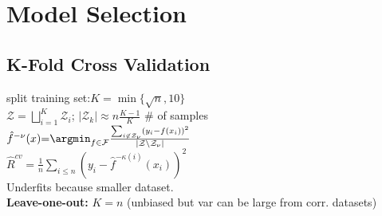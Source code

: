 \section*{Model Selection}
\subsection*{K-Fold Cross Validation}
split training set:$K=\min\{\sqrt{n},10\}$\\
$\mathcal{Z}=\bigsqcup^{K}_{i=1}\mathcal{Z}_i $;
$|\mathcal{Z}_k|\approx n\frac{K-1}{K}$ \# of samples\\
$\hat{f}^{-\nu}(x){=}
\argmin_{f\in\mathcal{F}}\frac{\sum_{i\not\in\mathcal{Z}_\nu}(y_i-f(x_i))^2}{|\mathcal{Z}\setminus\mathcal{Z}_{\nu}|}$\\
$\hat{R}^{cv} = \frac{1}{n}\sum_{i\leq n}(y_i-\hat{f}^{-\kappa(i)}(x_i))^2$\\
Underfits because smaller dataset.\\
\textbf{Leave-one-out:} $K=n$ (unbiased but var can be large from corr. datasets)



